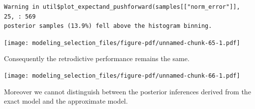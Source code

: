 \documentclass[
  letterpaper,
  DIV=11,
  numbers=noendperiod]{scrartcl}
\newenvironment{Shaded}{\begin{snugshade}}{\end{snugshade}}
\newcommand{\AttributeTok}[1]{\textcolor[rgb]{0.40,0.45,0.13}{#1}}
\newcommand{\ConstantTok}[1]{\textcolor[rgb]{0.56,0.35,0.01}{#1}}
\newcommand{\DecValTok}[1]{\textcolor[rgb]{0.68,0.00,0.00}{#1}}
\newcommand{\FunctionTok}[1]{\textcolor[rgb]{0.28,0.35,0.67}{#1}}
\newcommand{\NormalTok}[1]{\textcolor[rgb]{0.00,0.23,0.31}{#1}}
\newcommand{\OtherTok}[1]{\textcolor[rgb]{0.00,0.23,0.31}{#1}}
\newcommand{\SpecialCharTok}[1]{\textcolor[rgb]{0.37,0.37,0.37}{#1}}
\newcommand{\StringTok}[1]{\textcolor[rgb]{0.13,0.47,0.30}{#1}}
\begin{document}
\begin{verbatim}
Warning in util$plot_expectand_pushforward(samples[["norm_error"]], 25, : 569
posterior samples (13.9%) fell above the histogram binning.
\end{verbatim}

\texttt{[image: modeling\_selection\_files/figure-pdf/unnamed-chunk-65-1.pdf]}

Consequently the retrodictive performance remains the same.

\begin{Shaded}
\end{Shaded}

\texttt{[image: modeling\_selection\_files/figure-pdf/unnamed-chunk-66-1.pdf]}

Moreover we cannot distinguish between the posterior inferences derived
from the exact model and the approximate model.
\end{document}
